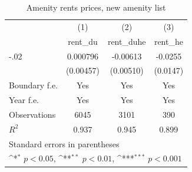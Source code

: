 \begin{table}[htbp]\centering
\def\sym#1{\ifmmode^{#1}\else\(^{#1}\)\fi}
\caption{Amenity rents prices, new amenity list}
\begin{tabular}{l*{3}{c}}
\hline\hline
                    &\multicolumn{1}{c}{(1)}&\multicolumn{1}{c}{(2)}&\multicolumn{1}{c}{(3)}\\
                    &\multicolumn{1}{c}{rent\_du}&\multicolumn{1}{c}{rent\_duhe}&\multicolumn{1}{c}{rent\_he}\\
\hline
-.02                &    0.000796         &    -0.00613         &     -0.0255         \\
                    &   (0.00457)         &   (0.00510)         &    (0.0147)         \\
[1em]
Boundary f.e.       &         Yes         &         Yes         &         Yes         \\
[1em]
Year f.e.           &         Yes         &         Yes         &         Yes         \\
\hline
Observations        &        6045         &        3101         &         390         \\
\(R^{2}\)           &       0.937         &       0.945         &       0.899         \\
\hline\hline
\multicolumn{4}{l}{\footnotesize Standard errors in parentheses}\\
\multicolumn{4}{l}{\footnotesize \sym{*} \(p<0.05\), \sym{**} \(p<0.01\), \sym{***} \(p<0.001\)}\\
\end{tabular}
\end{table}
